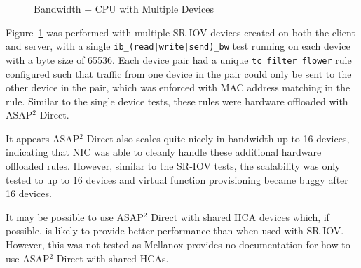 \documentclass[12pt,titlepage]{article}
\begin{document}
\begin{figure}
	\centering
	\caption{Bandwidth + CPU with Multiple Devices}%
	\label{fig:asap2_direct_multi_vdev}
\end{figure}

Figure~\ref{fig:asap2_direct_multi_vdev} was performed with multiple SR-IOV devices created on both the client and server, with a single \texttt{ib\_(read|write|send)\_bw} test running on each device with a byte size of 65536.
Each device pair had a unique \texttt{tc filter flower} rule configured such that traffic from one device in the pair could only be sent to the other device in the pair, which was enforced with MAC address matching in the rule.
Similar to the single device tests, these rules were hardware offloaded with ASAP$^2$ Direct.

It appears ASAP$^2$ Direct also scales quite nicely in bandwidth up to 16 devices, indicating that NIC was able to cleanly handle these additional hardware offloaded rules.
However, similar to the SR-IOV tests, the scalability was only tested to up to 16 devices and virtual function provisioning became buggy after 16 devices.

It may be possible to use ASAP$^2$ Direct with shared HCA devices which, if possible, is likely to provide better performance than when used with SR-IOV\@.
However, this was not tested as Mellanox provides no documentation for how to use ASAP$^2$ Direct with shared HCAs.
\end{document}
